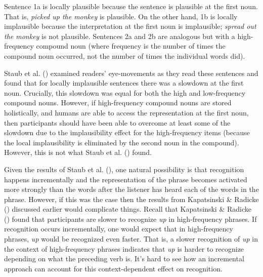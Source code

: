 \documentclass[
  12pt,
  letterpaper,
]{scrreport}
\begin{document}
Sentence 1a is locally plausible because the sentence is plausible at
the first noun. That is, \emph{picked up the monkey} is plausible. On
the other hand, 1b is locally implausible because the interpretation at
the first noun is implausible; \emph{spread out the monkey} is not
plausible. Sentences 2a and 2b are analogous but with a high-frequency
compound noun (where frequency is the number of times the compound noun
occurred, not the number of times the individual words did).

Staub et al. ()
examined readers' eye-movements as they read these sentences and found
that for locally implausible sentences there was a slowdown at the first
noun. Crucially, this slowdown was equal for both the high and
low-frequency compound nouns. However, if high-frequency compound nouns
are stored holistically, and humans are able to access the
representation at the first noun, then participants should have been
able to overcome at least some of the slowdown due to the implausibility
effect for the high-frequency items (because the local implausibility is
eliminated by the second noun in the compound). However, this is not
what Staub et al. ()
found.

Given the results of Staub et al.
(), one natural
possibility is that recognition happens incrementally and the
representation of the phrase becomes activated more strongly than the
words after the listener has heard each of the words in the phrase.
However, if this was the case then the results from Kapatsinski \&
Radicke ()
discussed earlier would complicate things. Recall that Kapatsinski \&
Radicke ()
found that participants are slower to recognize \emph{up} in
high-frequency phrases. If recognition occurs incrementally, one would
expect that in high-frequency phrases, \emph{up} would be recognized
even faster. That is, a slower recognition of \emph{up} in the context
of high-frequency phrases indicates that \emph{up} is harder to
recognize depending on what the preceding verb is. It's hard to see how
an incremental approach can account for this context-dependent effect on
recognition.
\end{document}
